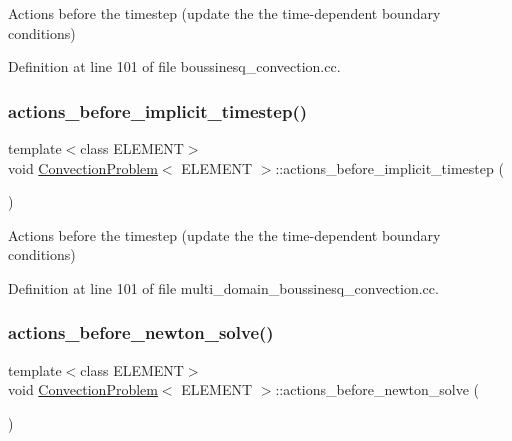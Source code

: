 Actions before the timestep (update the the time-\/dependent boundary conditions) 



Definition at line 101 of file boussinesq\+\_\+convection.\+cc.

\mbox{\label{classConvectionProblem_a37c80882d173c02bfb3dfca924a4ec61}} 
\subsubsection{\texorpdfstring{actions\+\_\+before\+\_\+implicit\+\_\+timestep()}{actions\_before\_implicit\_timestep()}\hspace{0.1cm}{\footnotesize\ttfamily [2/2]}}
{\footnotesize\ttfamily template$<$class E\+L\+E\+M\+E\+NT$>$ \\
void \hyperlink{classConvectionProblem}{Convection\+Problem}$<$ E\+L\+E\+M\+E\+NT $>$\+::actions\+\_\+before\+\_\+implicit\+\_\+timestep (\begin{DoxyParamCaption}{ }\end{DoxyParamCaption})\hspace{0.3cm}{\ttfamily [inline]}}



Actions before the timestep (update the the time-\/dependent boundary conditions) 



Definition at line 101 of file multi\+\_\+domain\+\_\+boussinesq\+\_\+convection.\+cc.

\mbox{\label{classConvectionProblem_a2fe48dd44ece8a0a69539ffcdce9ec11}} 
\subsubsection{\texorpdfstring{actions\+\_\+before\+\_\+newton\+\_\+solve()}{actions\_before\_newton\_solve()}\hspace{0.1cm}{\footnotesize\ttfamily [1/2]}}
{\footnotesize\ttfamily template$<$class E\+L\+E\+M\+E\+NT$>$ \\
void \hyperlink{classConvectionProblem}{Convection\+Problem}$<$ E\+L\+E\+M\+E\+NT $>$\+::actions\+\_\+before\+\_\+newton\+\_\+solve (\begin{DoxyParamCaption}{ }\end{DoxyParamCaption})\hspace{0.3cm}{\ttfamily [inline]}}



